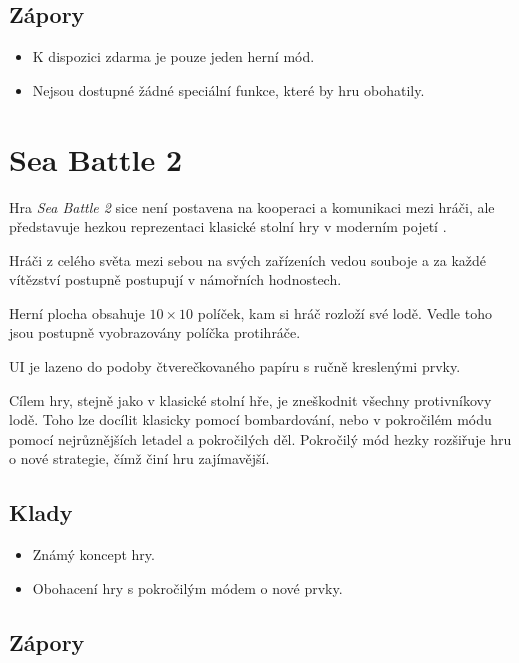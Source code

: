 \subsection*{Zápory}

\begin{itemize}
    \item K dispozici zdarma je pouze jeden herní mód.
    \item Nejsou dostupné žádné speciální funkce, které by hru obohatily.
\end{itemize}

\section{Sea Battle 2}

Hra \emph{Sea Battle 2} sice není postavena na kooperaci a komunikaci mezi
hráči,
ale představuje hezkou reprezentaci klasické stolní hry v moderním pojetí
\cite{byril_sea}.

Hráči z celého světa mezi sebou na svých zařízeních vedou souboje
a za každé vítězství postupně postupují v námořních hodnostech.

Herní plocha obsahuje $10 \times 10$ políček,
kam si hráč rozloží své lodě.
Vedle toho jsou postupně vyobrazovány políčka protihráče. 

UI je lazeno do podoby čtverečkovaného papíru s ručně kreslenými prvky.

Cílem hry, stejně jako v klasické stolní hře,
je zneškodnit všechny protivníkovy lodě.
Toho lze docílit klasicky pomocí bombardování,
nebo v pokročilém módu pomocí nejrůznějších letadel a pokročilých děl.
Pokročilý mód hezky rozšiřuje hru o nové strategie,
čímž činí hru zajímavější.

\FloatBarrier

\subsection*{Klady}

\begin{itemize}
    \item Známý koncept hry.
    \item Obohacení hry s pokročilým módem o nové prvky.
\end{itemize}

\subsection*{Zápory}

